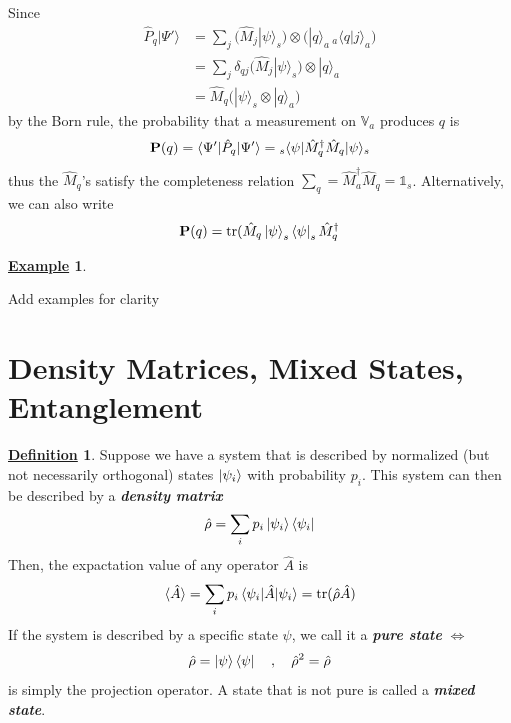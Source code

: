\documentclass[11pt, answers]{exam}
\newcommand{\prob}{\textbf{P}}
\newcommand{\avg}[1]{\langle {#1} \rangle}
\theoremstyle{definition}
\newtheorem{definition}{\underline{Definition}}[section]
\newtheorem{example}{\underline{Example}}[section]
\theoremstyle{bulleted}
\begin{document}
	Since
	\[
	\begin{aligned}
		\hat P_q|\Psi'\rangle
		&=
		\sum_j
		\bigl(\hat{M}_j|\psi\rangle_s\bigr)
		\otimes
		\bigl(|q\rangle_a\,{}_a\langle q|j\rangle_a\bigr)\\
		&=
		\sum_j
		\delta_{qj}\bigl(\hat{M}_j|\psi\rangle_s\bigr)\otimes|q\rangle_a\\
		&=
		{\hat{M}_q\bigl(|\psi\rangle_s\otimes|q\rangle_a}\bigr)
	\end{aligned}
	\]
	by the Born rule, the probability that a measurement on $\mathbb{V}_a$ produces $q$ is
	\begin{align*}
		\prob(q)  = \braket{\Psi' | \hat{P}_q | \Psi'} = {}_s\langle\psi | \hat{M}_q^\dagger \hat{M}_q | \psi\rangle_s
	\end{align*}
	thus the $\hat{M}_q$'s satisfy the completeness relation $\sum_{q} = \hat{M}_a^\dagger \hat{M}_q=\mathds{1}_s$. Alternatively, we can also write
	\begin{align*}
		\prob(q) = \operatorname{tr}(\hat{M}_q\ket{\psi}_s\bra{\psi}_s \hat{M}_q^\dagger
	\end{align*}
	\begin{example}
		\begin{todo}
			Add examples for clarity
		\end{todo}
	\end{example}
	
	\section{Density Matrices, Mixed States, Entanglement}
	\begin{definition}
		Suppose we have a system that is described by normalized (but not necessarily orthogonal) states $\ket{\psi_i}$ with probability $p_i$. This system can then be described by a \textit{\textbf{density matrix}}
		\begin{align*}
			\hat{\rho} = \sum_{i} p_i \ket{\psi_i}\bra{\psi_i}
		\end{align*}
		Then, the expactation value of any operator $\hat{A}$ is
		\begin{align*}
			\avg{\hat{A}} = \sum_{i} p_i \braket{\psi_i | \hat{A} | \psi_i} = \operatorname{tr}(\hat{\rho}\hat{A})
		\end{align*}
		If the system is described by a specific state $\psi$, we call it a \textit{\textbf{pure state}} $\iff$
		\begin{align*}
			\hat{\rho} = \ket{\psi}\bra{\psi} \quad,\quad \hat{\rho}^2 = \hat{\rho}
		\end{align*}
		is simply the projection operator. A state that is not pure is called a \textit{\textbf{mixed state}}.
	\end{definition}
\end{document}
